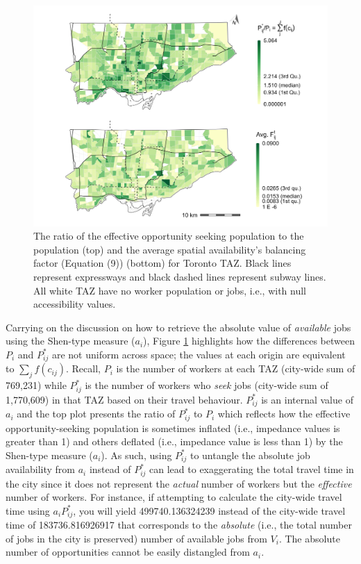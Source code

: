\documentclass[]{elsarticle} %
\begin{document}
\begin{figure}
\includegraphics[width=1\linewidth]{images/internal-values-plot} \caption{\label{fig:internal-values-plot}  The ratio of the effective opportunity seeking population to the population (top) and the average spatial availability's balancing factor (Equation (9)) (bottom) for Toronto TAZ. Black lines represent expressways and black dashed lines represent subway lines. All white TAZ have no worker population or jobs, i.e., with null accessibility values.}\label{fig:internal-values-plot}
\end{figure}

Carrying on the discussion on how to retrieve the absolute value of
\emph{available} jobs using the Shen-type measure (\(a_i\)), Figure
\ref{fig:internal-values-plot} highlights how the differences between
\(P_i\) and \(P_{ij}^*\) are not uniform across space; the values at
each origin are equivalent to \(\sum_j f(c_{ij})\). Recall, \(P_i\) is
the number of workers at each TAZ (city-wide sum of 769,231) while
\(P_{ij}^*\) is the number of workers who \emph{seek} jobs (city-wide
sum of 1,770,609) in that TAZ based on their travel behaviour.
\(P_{ij}^*\) is an internal value of \(a_i\) and the top plot presents
the ratio of \(P_{ij}^*\) to \(P_i\) which reflects how the effective
opportunity-seeking population is sometimes inflated (i.e., impedance
values is greater than 1) and others deflated (i.e., impedance value is
less than 1) by the Shen-type measure (\(a_i\)). As such, using
\(P_{ij}^*\) to untangle the absolute job availability from \(a_i\)
instead of \(P_{ij}^*\) can lead to exaggerating the total travel time
in the city since it does not represent the \emph{actual} number of
workers but the \emph{effective} number of workers. For instance, if
attempting to calculate the city-wide travel time using
\(a_i P_{ij}^*\), you will yield 499740.136324239 instead of the
city-wide travel time of 183736.816926917 that corresponds to the
\emph{absolute} (i.e., the total number of jobs in the city is
preserved) number of available jobs from \(V_i\). The absolute number of
opportunities cannot be easily distangled from \(a_i\).
\end{document}
